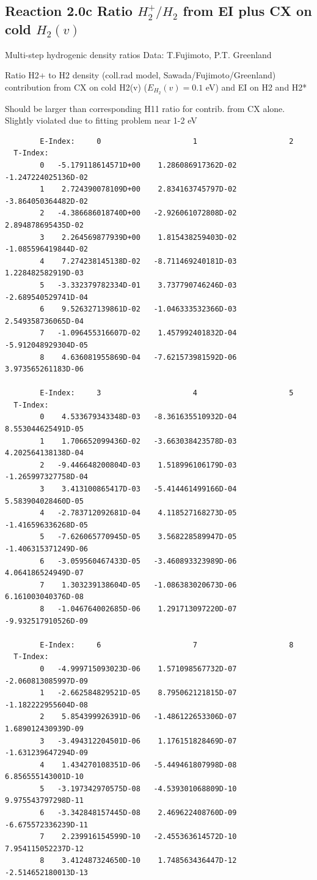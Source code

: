 \documentclass[12pt,dvips]{article}
\begin{document}
\newpage

\subsection{
Reaction 2.0c   Ratio $H_2^+/H_2$ from EI plus CX on cold $H_2(v)$}

 Multi-step hydrogenic density ratios
 Data: T.Fujimoto, P.T. Greenland


  Ratio H2+ to H2 density
  (coll.rad model, Sawada/Fujimoto/Greenland)
  contribution from CX on cold H2(v) ($E_{H_2}(v)=0.1$ eV) and EI on H2 and H2*


Should be larger than corresponding H11 ratio for contrib. from CX alone.
Slightly violated due to fitting problem near 1-2 eV

\begin{small}\begin{verbatim}
        E-Index:     0                     1                     2
  T-Index:
        0   -5.179118614571D+00    1.286086917362D-02   -1.247224025136D-02
        1    2.724390078109D+00    2.834163745797D-02   -3.864050364482D-02
        2   -4.386686018740D+00   -2.926061072808D-02    2.894878695435D-02
        3    2.264569877939D+00    1.815438259403D-02   -1.085596419844D-02
        4    7.274238145138D-02   -8.711469240181D-03    1.228482582919D-03
        5   -3.332379782334D-01    3.737790746246D-03   -2.689540529741D-04
        6    9.526327139861D-02   -1.046333532366D-03    2.549358736065D-04
        7   -1.096455316607D-02    1.457992401832D-04   -5.912048929304D-05
        8    4.636081955869D-04   -7.621573981592D-06    3.973565261183D-06

        E-Index:     3                     4                     5
  T-Index:
        0    4.533679343348D-03   -8.361635510932D-04    8.553044625491D-05
        1    1.706652099436D-02   -3.663038423578D-03    4.202564138138D-04
        2   -9.446648200804D-03    1.518996106179D-03   -1.265997327758D-04
        3    3.413100865417D-03   -5.414461499166D-04    5.583904028460D-05
        4   -2.783712092681D-04    4.118527168273D-05   -1.416596336268D-05
        5   -7.626065770945D-05    3.568228589947D-05   -1.406315371249D-06
        6   -3.059560467433D-05   -3.460893323989D-06    4.064186524949D-07
        7    1.303239138604D-05   -1.086383020673D-06    6.161003040376D-08
        8   -1.046764002685D-06    1.291713097220D-07   -9.932517910526D-09

        E-Index:     6                     7                     8
  T-Index:
        0   -4.999715093023D-06    1.571098567732D-07   -2.060813085997D-09
        1   -2.662584829521D-05    8.795062121815D-07   -1.182222955604D-08
        2    5.854399926391D-06   -1.486122653306D-07    1.689012430939D-09
        3   -3.494312204501D-06    1.176151828469D-07   -1.631239647294D-09
        4    1.434270108351D-06   -5.449461807998D-08    6.856555143001D-10
        5   -3.197342970575D-08   -4.539301068809D-10    9.975543797298D-11
        6   -3.342848157445D-08    2.469622408760D-09   -6.675572336239D-11
        7    2.239916154599D-10   -2.455363614572D-10    7.954115052237D-12
        8    3.412487324650D-10    1.748563436447D-12   -2.514652180013D-13


\end{verbatim}
\end{small}
\end{document}

